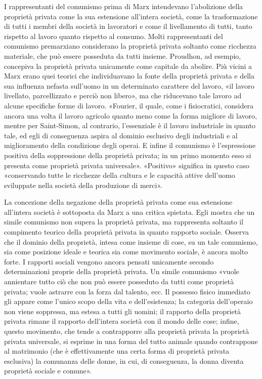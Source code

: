 \documentclass[12pt,a4paper,openany]{book}
\begin{document}
I rappresentanti del comunismo prima di Marx intendevano l'abolizione della proprietà privata come la sua estensione all'intera società, come la trasformazione di tutti i membri della società in lavoratori e come il livellamento di tutti, tanto rispetto al lavoro quanto rispetto al consumo. Molti rappresentanti del comunismo premarxiano considerano la proprietà privata soltanto come ricchezza materiale, che può essere posseduta da tutti insieme. Proudhon, ad esempio, concepiva la proprietà privata unicamente come capitale da abolire. Più vicini a Marx erano quei teorici che individuavano la fonte della proprietà privata e della sua influenza nefasta sull'uomo in un determinato carattere del lavoro, «il lavoro livellato, parcellizzato e perciò non libero», ma che riducevano tale lavoro ad alcune specifiche forme di lavoro. «Fourier, il quale, come i fisiocratici, considera ancora una volta il lavoro agricolo quanto meno come la forma migliore di lavoro, mentre per Saint-Simon, al contrario, l'essenziale è il lavoro industriale in quanto tale, ed egli di conseguenza aspira al dominio esclusivo degli industriali e al miglioramento della condizione degli operai. E infine il comunismo è l'espressione positiva della soppressione della proprietà privata; in un primo momento esso si presenta come proprietà privata universale». «Positivo» significa in questo caso «conservando tutte le ricchezze della cultura e le capacità attive dell'uomo sviluppate nella società della produzione di merci».

La concezione della negazione della proprietà privata come sua estensione all'intera società è sottoposta da Marx a una critica spietata. Egli mostra che un simile comunismo non supera la proprietà privata, ma rappresenta soltanto il compimento teorico della proprietà privata in quanto rapporto sociale. Osserva che il dominio della proprietà, intesa come insieme di cose, su un tale comunismo, sia come posizione ideale e teorica sia come movimento sociale, è ancora molto forte. I rapporti sociali vengono ancora pensati unicamente secondo determinazioni proprie della proprietà privata. Un simile comunismo «vuole annientare tutto ciò che non può essere posseduto da tutti come proprietà privata; vuole astrarre con la forza dal talento, ecc. Il possesso fisico immediato gli appare come l'unico scopo della vita e dell'esistenza; la categoria dell'operaio non viene soppressa, ma estesa a tutti gli uomini; il rapporto della proprietà privata rimane il rapporto dell'intera società con il mondo delle cose; infine, questo movimento, che tende a contrapporre alla proprietà privata la proprietà privata universale, si esprime in una forma del tutto animale quando contrappone al matrimonio (che è effettivamente una certa forma di proprietà privata esclusiva) la comunanza delle donne, in cui, di conseguenza, la donna diventa proprietà sociale e comune».
\end{document}
